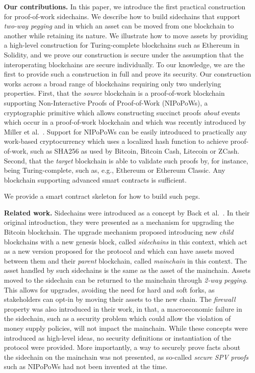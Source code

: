 \noindent\textbf{Our contributions. } In this paper, we introduce the first
practical construction for proof-of-work sidechains. We describe how to build
sidechains that support \emph{two-way pegging} and in which an asset can be
moved from one blockchain to another while retaining its nature. We illustrate
how to move assets by providing a high-level construction for Turing-complete
blockchains such as Ethereum in Solidity, and we prove our construction is
secure under the assumption that the interoperating blockchains are secure
individually. To our knowledge, we are the first to provide such a construction
in full and prove its security. Our construction works across a broad range of
blockchains requiring only two underlying properties. First, that the
\emph{source} blockchain is a proof-of-work blockchain supporting
Non-Interactive Proofs of Proof-of-Work (NIPoPoWs), a cryptographic primitive
which allows constructing succinct proofs \emph{about} events which occur in a
proof-of-work blockchain and which was recently introduced by Miller et
al.~\cite{nipopows}. Support for NIPoPoWs can be easily introduced to practically
any work-based cryptocurrency which uses a localized hash function to achieve
proof-of-work, such as SHA256 as used by Bitcoin, Bitcoin Cash, Litecoin or
ZCash. Second, that the \emph{target} blockchain is able to validate such proofs
by, for instance, being Turing-complete, such as, e.g., Ethereum or Ethereum
Classic. Any blockchain supporting advanced smart contracts is sufficient.

We provide a smart contract skeleton for how to build such pegs.

\noindent\textbf{Related work. }
Sidechains were introduced as a concept by Back et al.~\cite{sidechains}. In
their original introduction, they were presented as a mechanism for upgrading
the Bitcoin blockchain. The upgrade mechanism proposed introducing new
\emph{child} blockchains with a new genesis block, called
\emph{sidechains} in this context, which act as a new version proposed for the
protocol and which can have assets moved between them and their \emph{parent}
blockchain, called \emph{mainchain} in this context. The asset handled by such
sidechains is the same as the asset of the mainchain. Assets moved to the
sidechain can be returned to the mainchain through \emph{2-way pegging}. This
allows for upgrades, avoiding the need for hard and soft forks, as stakeholders
can opt-in by moving their assets to the new chain. The \emph{firewall}
property was also introduced in their work, in that, a macroeconomic failure in
the sidechain, such as a security problem which could allow the violation of
money supply policies, will not impact the mainchain. While these concepts were
introduced as high-level ideas, no security definitions or instantiation of the
protocol were provided. More importantly, a way to securely prove facts about
the sidechain on the mainchain was not presented, as so-called \emph{secure SPV
proofs} such as NIPoPoWs had not been invented at the time.

